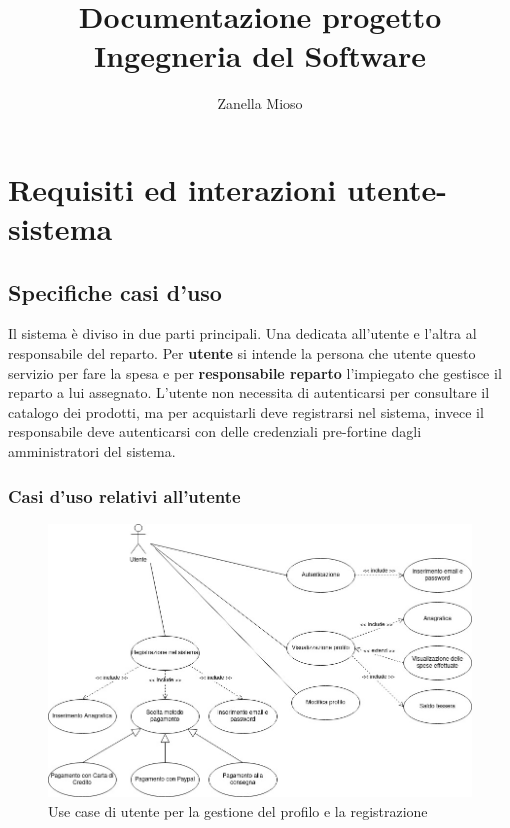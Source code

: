 \documentclass{article}
\author{Zanella Mioso}
\title{Documentazione progetto Ingegneria del Software}
\begin{document}
\maketitle

\newpage

\tableofcontents

\newpage

\section{Requisiti ed interazioni utente-sistema}

\subsection{Specifiche casi d’uso}

Il sistema è diviso in due parti principali. Una dedicata all'utente e l'altra
al responsabile del reparto. Per \textbf{utente} si intende la persona che utente questo
servizio per fare la spesa e per \textbf{responsabile reparto} l'impiegato che gestisce
il reparto a lui assegnato. L’utente non necessita di autenticarsi per consultare il
catalogo dei prodotti, ma per acquistarli deve registrarsi nel sistema, invece il
responsabile deve autenticarsi con delle credenziali pre-fortine dagli amministratori
del sistema.

\subsubsection{Casi d'uso relativi all'utente}

\begin{figure}[h!]
	\centering
	\includegraphics[width=\textwidth]{UseCaseUtenteGestioneProfilo.jpg}
	\caption{Use case di utente per la gestione del profilo e la registrazione}
	\label{fig:UseCaseUtenteGestioneProfilo}
\end{figure}
\end{document}
